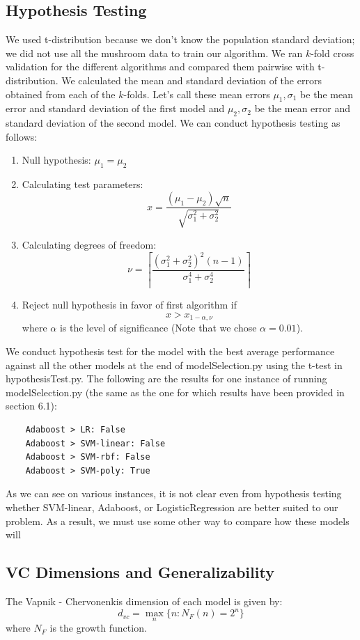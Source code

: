 \documentclass[fleqn]{article}
\begin{document}
    \subsection{Hypothesis Testing}
    We used t-distribution because we don’t know the population standard deviation; we did
    not use all the mushroom data to train our algorithm. We ran $k$-fold cross validation
    for the different algorithms and compared them pairwise with t-distribution. We
    calculated the mean and standard deviation of the errors obtained from each of the
    $k$-folds. Let's call these mean errors $ \mu_1, \sigma_1 $ be the mean error and standard
    deviation of the first model and $ \mu_2, \sigma_2 $ be the mean error and standard
    deviation of the second model. We can conduct hypothesis testing as follows:
    \begin{enumerate}
        \item Null hypothesis: $ \mu_1= \mu_2 $
        \item Calculating test parameters:
            $$ x = \frac{(\mu_1-\mu_2)\sqrt{n}}{\sqrt{\sigma_1^2 + \sigma_2^2}} $$
        \item Calculating degrees of freedom:
            $$ \nu = \left\lceil \frac{(\sigma_1^2 + \sigma_2^2)^2 (n-1)}{\sigma_1^4 + \sigma_2^4} \right\rceil $$
        \item Reject null hypothesis in favor of first algorithm if
            $$ x > x_{1-\alpha, \nu} $$
            where $ \alpha $ is the level of significance (Note that we chose $ \alpha = 0.01 $).
    \end{enumerate}
    We conduct hypothesis test for the model with the best average performance against all
    the other models at the end of modelSelection.py using the t-test in hypothesisTest.py.
    The following are the results for one instance of running modelSelection.py (the same
    as the one for which results have been provided in section 6.1):
    \begin{lstlisting}
    Adaboost > LR: False
    Adaboost > SVM-linear: False
    Adaboost > SVM-rbf: False
    Adaboost > SVM-poly: True
    \end{lstlisting}
    As we can see on various instances, it is not clear even from hypothesis testing whether
    SVM-linear, Adaboost, or LogisticRegression are better suited to our problem. As a result,
    we must use some other way to compare how these models will

    \subsection{VC Dimensions and Generalizability}
    The Vapnik - Chervonenkis dimension of each model is given by:
        $$ d_{vc} = \max_n\{n: N_F(n)=2^n\} $$
    where $ N_F $ is the growth function.\\
\end{document}

